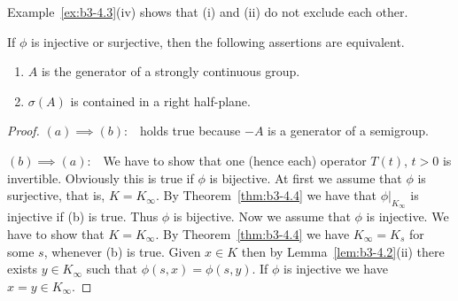 Example~\ref{ex:b3-4.3}(iv) shows that (i) and (ii) do not exclude each other.
\begin{corollary}\label{cor:b3-4.5}
	If $\phi$ is injective or surjective, then the following assertions are equivalent.
	\begin{enumerate}[\upshape (a)]
		\item 
		$A$ is the generator of a strongly continuous group.
		
		\item 
		$\sigma(A)$ is contained in a right half-plane.
	\end{enumerate}
\end{corollary}
\begin{proof}
	$(a)\implies(b)$:\ \  holds true because $-A$ is a generator of a semigroup.
	
	$(b)\implies(a)$:\ \ 
	We have to show that one (hence each) operator $T(t)$, $t > 0$ is invertible.
	Obviously this is true if $\phi$ is bijective.
	At first we assume that $\phi$ is surjective, that is, $K = K_{\infty}$.
	By Theorem~\ref{thm:b3-4.4} we have that $\phi|_{K_{\infty}}$ is injective if (b) is true.
	Thus $\phi$ is bijective.
	Now we assume that $\phi$ is injective.
	We have to show that $K = K_{\infty}$.
	By Theorem~\ref{thm:b3-4.4} we have $K_{\infty} = K_{s}$ for some $s$, whenever (b) is true.
	Given $x \in K$ then by Lemma~\ref{lem:b3-4.2}(ii) there exists $y \in K_{\infty}$ such that $\phi(s,x) = \phi(s,y)$.
	If $\phi$ is injective we have $x = y \in K_{\infty}$.
\end{proof}
